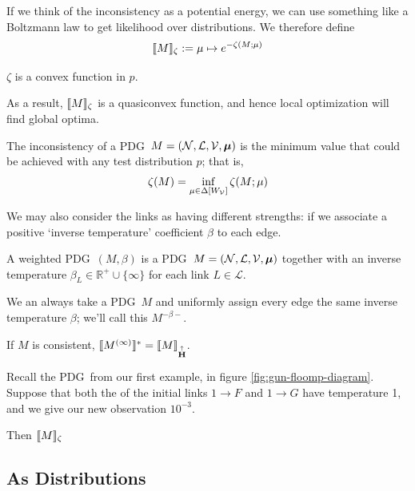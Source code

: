 \documentclass{article}
\newcommand\MaxEnt{{\overset{\uparrow}{\mathbf H}}}
\newcommand\bmu{\boldsymbol{\mu}}
\newcommand{\MN}{PDG}
\begin{document}
	If we think of the inconsistency as a potential energy, we can use something like a Boltzmann law to get likelihood over distributions. We therefore define	
	\[\llbracket M\rrbracket_\zeta := \mu \mapsto e^{-\zeta(M;\mu)}\]


	\begin{prop}[restate=thmzetaconvex]
		$\zeta$ is a convex function in $p$.
	\end{prop}
	As a result, $\llbracket M\rrbracket_\zeta$ is a quasiconvex function, and hence local optimization will find global optima.

	\begin{defn}
		The inconsistency of a \MN\ $M = (\cal N, L, V, \bmu)$ is the minimum value that could be achieved with any test distribution $p$; that is, 
		\[ \zeta(M) = \inf_{ \mu \in \Delta [W_{\cal V}]} \zeta (M; \mu) 
			 \]
		
	\end{defn}


	We may also consider the links as having different strengths: if we associate a positive `inverse temperature' coefficient $\beta$ to each edge.
	
	\begin{defn}
		A weighted \MN\ $(M, \beta)$ is a \MN\ $M = (\cal N, L, V, \bmu)$ together with an inverse temperature $\beta_L \in \mathbb R^+ \cup \{\infty\}$ for each link $L \in \mathcal L$.
	\end{defn}

	We an always take a \MN\ $M$ and uniformly assign every edge the same inverse temperature $\beta$; we'll call this $M^{-\beta-}$.
	
	\begin{prop}
		If $M$ is consistent, $\bbr{M^{(\infty)}}^* = \bbr{M}_\MaxEnt$.
	\end{prop}


	\begin{example}[continues=ex:guns-and-floomps]
		Recall the \MN\ from our first example, in figure \ref{fig:gun-floomp-diagram}. Suppose that both the of the initial links $1 \to F$ and $1\to G$ have temperature 1, and we give our new observation $10^{-3}$.
		
		Then $\llbracket M\rrbracket_\zeta$
		\todo{}
	\end{example}	
	
	
	
	
	\subsection{As Distributions}
	
\end{document}
